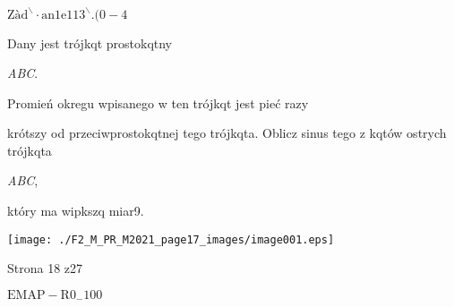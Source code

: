 \documentclass[a4paper,12pt]{article}
\begin{document}
$\mathrm{Z}\text{à} \mathrm{d}^{\backslash }\cdot \mathrm{a}\mathrm{n}1\mathrm{e}1 13^{\backslash }. (0-4$

Dany jest trójkqt prostokqtny

{\it ABC}.

Promień okregu wpisanego w ten trójkqt jest pieć razy

krótszy od przeciwprostokqtnej tego trójkqta. Oblicz sinus tego z kqtów ostrych trójkqta

{\it ABC},

który ma wipkszq miar9.
\begin{center}
\texttt{[image: ./F2\_M\_PR\_M2021\_page17\_images/image001.eps]}
\end{center}
Strona 18 z27

$\mathrm{E}\mathrm{M}\mathrm{A}\mathrm{P}-\mathrm{R}0_{-}100$
\end{document}
